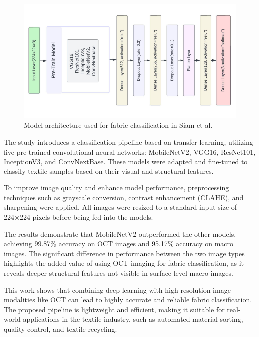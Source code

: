 \begin{figure}[H]
    \centering
    \begin{minipage}{1\linewidth}
        \includegraphics[width=\linewidth]{images/Paper2Model.png}
    \end{minipage}
    \caption[Model architecture - Siam et al.~\cite{siam2023textilenet}]{Model architecture used for fabric classification in Siam et al.~\cite{siam2023textilenet}}
\end{figure}

The study introduces a classification pipeline based on transfer learning, utilizing five pre-trained convolutional neural networks: MobileNetV2, VGG16, ResNet101, InceptionV3, and ConvNextBase. These models were adapted and fine-tuned to classify textile samples based on their visual and structural features.

To improve image quality and enhance model performance, preprocessing techniques such as grayscale conversion, contrast enhancement (CLAHE), and sharpening were applied. All images were resized to a standard input size of 224×224 pixels before being fed into the models.

The results demonstrate that MobileNetV2 outperformed the other models, achieving 99.87\% accuracy on OCT images and 95.17\% accuracy on macro images. The significant difference in performance between the two image types highlights the added value of using OCT imaging for fabric classification, as it reveals deeper structural features not visible in surface-level macro images.

This work shows that combining deep learning with high-resolution image modalities like OCT can lead to highly accurate and reliable fabric classification. The proposed pipeline is lightweight and efficient, making it suitable for real-world applications in the textile industry, such as automated material sorting, quality control, and textile recycling.

